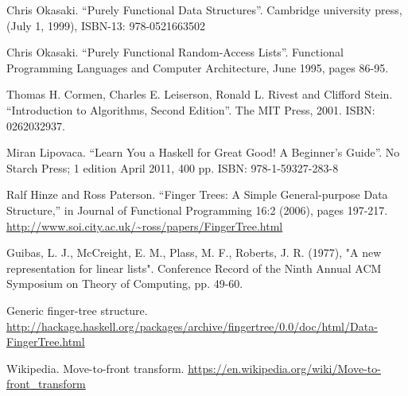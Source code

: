 \documentclass[b5paper]{article}
\begin{document}
\begin{thebibliography}{99}

Chris Okasaki. ``Purely Functional Data Structures''. Cambridge university press, (July 1, 1999), ISBN-13: 978-0521663502

Chris Okasaki. ``Purely Functional Random-Access Lists''. Functional Programming Languages and Computer Architecture, June 1995, pages 86-95.

Thomas H. Cormen, Charles E. Leiserson, Ronald L. Rivest and Clifford Stein. ``Introduction to Algorithms, Second Edition''. The MIT Press, 2001. ISBN: 0262032937.

Miran Lipovaca. ``Learn You a Haskell for Great Good! A Beginner's Guide''. No Starch Press; 1 edition April 2011, 400 pp. ISBN: 978-1-59327-283-8

Ralf Hinze and Ross Paterson. ``Finger Trees: A Simple General-purpose Data Structure,'' in Journal of Functional Programming 16:2 (2006), pages 197-217. \url{http://www.soi.city.ac.uk/~ross/papers/FingerTree.html}

Guibas, L. J., McCreight, E. M., Plass, M. F., Roberts, J. R. (1977), "A new representation for linear lists". Conference Record of the Ninth Annual ACM Symposium on Theory of Computing, pp. 49-60.

Generic finger-tree structure. \url{http://hackage.haskell.org/packages/archive/fingertree/0.0/doc/html/Data-FingerTree.html}

Wikipedia. Move-to-front transform. \url{https://en.wikipedia.org/wiki/Move-to-front_transform}

\end{thebibliography}

\expandafter\enddocument
\fi
\end{document}
